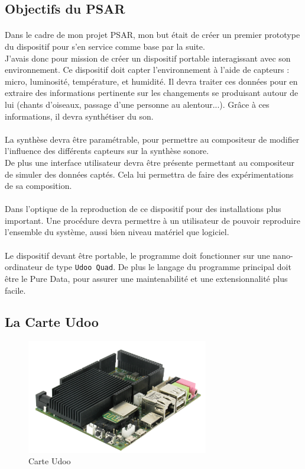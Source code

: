 \documentclass[a4paper, titlepage, oneside, 12pt]{article}%
\begin{document}
\subsection{Objectifs du PSAR}
\paragraph{}
Dans le cadre de mon projet PSAR, mon but était de créer un premier prototype du dispositif pour s'en service comme base par la suite.\\
J'avais donc pour mission de créer un dispositif portable interagissant avec son environnement. Ce dispositif doit capter l'environnement à l'aide de capteurs : micro, luminosité, température, et humidité. Il devra traiter ces données pour en extraire des informations pertinente sur les changements se produisant autour de lui (chants d'oiseaux, passage d'une personne au alentour...). Grâce à ces informations, il devra synthétiser du son.
\paragraph{}
La synthèse devra être paramétrable, pour permettre au compositeur de modifier
l’influence des différents capteurs sur la synthèse sonore.\\
De plus une interface utilisateur devra être présente permettant au compositeur de simuler des données captés. Cela lui permettra de faire des expérimentations de sa composition.
\paragraph{}
Dans l’optique de la reproduction de ce dispositif pour des installations plus important. Une procédure devra permettre à un utilisateur de pouvoir reproduire l’ensemble du système, aussi bien niveau matériel que logiciel.
\paragraph{}
Le dispositif devant être portable, le programme doit fonctionner sur une nano-ordinateur de type \texttt{Udoo Quad}. De plus le langage du programme principal doit être le Pure Data, pour assurer une maintenabilité et une extensionnalité plus facile.
\subsection{La Carte Udoo}
\begin{figure}
  \centering
  \includegraphics[width=300px]{udoo.jpg}
  \caption{Carte Udoo}
\end{figure}
\end{document}

